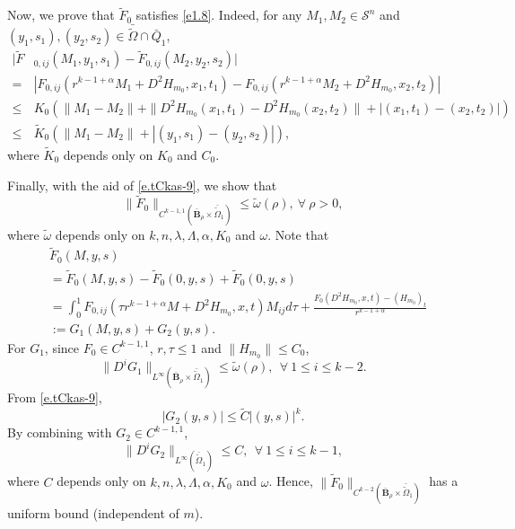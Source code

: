 \documentclass[preprint,12pt]{elsarticle}
\theoremstyle{definition}
\theoremstyle{remark}
\numberwithin{equation}{section}
\begin{document}
Now, we prove that $\tilde{F}_0$ satisfies \cref{e1.8}. Indeed, for any $M_1,M_2\in \mathcal{S}^{n}$ and $(y_1,s_1),(y_2,s_2)\in \bar{\tilde{\Omega}}\cap \bar Q_{1}$,
\begin{equation*}
  \begin{aligned}
|\tilde{F}&_{0,ij}(M_1,y_1,s_1)-\tilde{F}_{0,ij}(M_2,y_2,s_2)|\\
=&|F_{0,ij}(r^{k-1+\alpha}M_1+D^2H_{m_0},x_1,t_1)
-F_{0,ij}(r^{k-1+\alpha}M_2+D^2H_{m_0},x_2,t_2)|\\
\leq &K_0\left(\|M_1-M_2\|+\|D^2H_{m_0}(x_1,t_1)-D^2H_{m_0}(x_2,t_2)\|
+|(x_1,t_1)-(x_2,t_2)|\right)\\
\leq &\tilde{K}_0\left(\|M_1-M_2\|+|(y_1,s_1)-(y_2,s_2)|\right),
  \end{aligned}
\end{equation*}
where $\tilde{K}_0$ depends only on $K_0$ and $C_0$.

Finally, with the aid of \cref{e.tCkas-9}, we show that
\begin{equation}\label{e.F0.omega}
\|\tilde{F}_0\|_{C^{k-1,1}(\bar{\textbf{B}}_\rho\times \bar{\tilde\Omega}_1)}\leq \tilde{\omega}(\rho),~\forall ~\rho>0,
\end{equation}
where $\tilde{\omega}$ depends only on $k,n,\lambda, \Lambda,\alpha,K_0$ and $\omega$. Note that
\begin{equation}
  \begin{aligned}
&\tilde{F}_0(M,y,s)\\
&=\tilde{F}_0(M,y,s)-\tilde{F}_0(0,y,s)+\tilde{F}_0(0,y,s)\\
    &=\int_{0}^{1} F_{0,ij}\left(\tau r^{k-1+\alpha} M+D^2H_{m_0},x,t\right)M_{ij}d\tau
    +\frac{F_0(D^2H_{m_0},x,t)-(H_{m_0})_t}{r^{k-1+\alpha}}\\
    &:=G_1(M,y,s)+G_2(y,s).
  \end{aligned}
\end{equation}
For $G_1$, since $F_0\in C^{k-1,1}$, $r,\tau\leq 1$ and $\|H_{m_0}\|\leq C_0$,
\begin{equation*}
\|D^{i}G_1\|_{L^{\infty}(\bar{\textbf{B}}_\rho\times \bar{\tilde\Omega}_1)}\leq \tilde{\omega}(\rho),~~\forall ~1\leq i\leq k-2.
\end{equation*}
From \cref{e.tCkas-9},
\begin{equation*}
|G_2(y,s)|\leq \tilde{C}|(y,s)|^k.
\end{equation*}
By combining with $G_2\in C^{k-1,1}$,
\begin{equation*}
\|D^{i}G_2\|_{L^{\infty}(\bar{\tilde\Omega}_1)}\leq C, ~~\forall ~ 1\leq i\leq k-1,
\end{equation*}
where $C$ depends only on $k,n,\lambda, \Lambda,\alpha,K_0$ and $\omega$. Hence, $\|\tilde{F}_0\|_{C^{k-2}(\bar{\textbf{B}}_\rho\times \bar{\tilde\Omega}_1)}$ has a uniform bound (independent of $m$).
\end{document}
